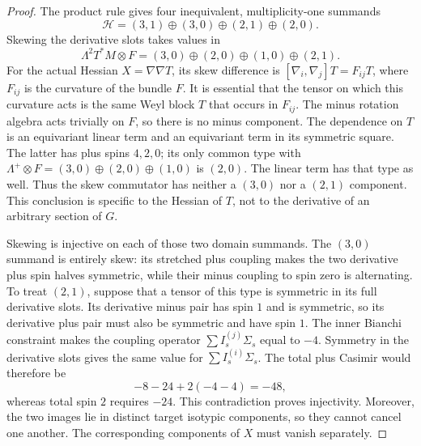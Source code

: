 \begin{proof}
The product rule gives four inequivalent, multiplicity-one summands
\[
 \mathcal H=(3,1)\oplus(3,0)\oplus(2,1)\oplus(2,0).
\]
Skewing the derivative slots takes values in
\[
 \Lambda^2T^*M\otimes F=(3,0)\oplus(2,0)\oplus(1,0)\oplus(2,1).
\]
For the actual Hessian $X=\nabla\nabla T$, its skew difference is
$[\nabla_i,\nabla_j]T=F_{ij}T$, where $F_{ij}$ is the curvature of the
bundle $F$. It is essential that the tensor on which this curvature
acts is the same Weyl block $T$ that occurs in $F_{ij}$. The minus
rotation algebra acts trivially on $F$, so there is no minus component.
The dependence on $T$ is an equivariant linear term and an equivariant
term in its symmetric square. The latter has plus spins $4,2,0$;
its only common type with $\Lambda^+\otimes F=(3,0)\oplus(2,0)\oplus(1,0)$
is $(2,0)$. The linear term has that type as well. Thus the skew
commutator has neither a $(3,0)$ nor a $(2,1)$ component. This conclusion
is specific to the Hessian of $T$, not to the derivative of an arbitrary
section of $G$.

Skewing is injective on each of those two domain summands.  The
\((3,0)\) summand is entirely skew: its stretched plus coupling makes the
two derivative plus spin halves symmetric, while their minus coupling
to spin zero is alternating.  To treat \((2,1)\), suppose that a tensor
of this type is symmetric in its full derivative slots.  Its derivative
minus pair has spin \(1\) and is symmetric, so its derivative plus pair
must also be symmetric and have spin \(1\).  The inner Bianchi constraint
makes the coupling operator \(\sum I_s^{(j)}\Sigma_s\) equal to \(-4\).
Symmetry in the derivative slots gives the same value for
\(\sum I_s^{(i)}\Sigma_s\).  The total plus Casimir would therefore be
\[
 -8-24+2(-4-4)=-48,
\]
whereas total spin \(2\) requires \(-24\).  This contradiction proves
injectivity.  Moreover, the two images lie in distinct target isotypic
components, so they cannot cancel one another.  The corresponding
components of \(X\) must vanish separately.


\end{proof}
